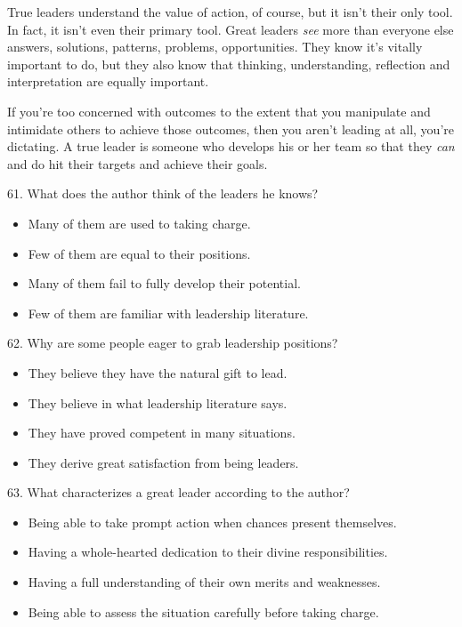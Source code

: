\documentclass[UTF8,11pt]{ctexart}
\begin{document}
True leaders understand the value of action, of course, but it isn’t their only tool. In fact, it isn’t even their primary tool. Great leaders\textit{ see} more than everyone else answers, solutions, patterns, problems, opportunities. They know it’s vitally important to do, but they also know that thinking, understanding, reflection and interpretation are equally important.


If you’re too concerned with outcomes to the extent that you manipulate and intimidate others to achieve those outcomes, then you aren’t leading at all, you’re dictating. A true leader is someone who develops his or her team so that they\textit{ can} and do hit their targets and achieve their goals.


61. What does the author think of the leaders he knows?


\begin{itemize}[leftmargin=2em,itemsep=.2em,topsep=.4em]\item[A.] Many of them are used to taking charge.
\item[B.] Few of them are equal to their positions.
\item[C.] Many of them fail to fully develop their potential.
\item[D.] Few of them are familiar with leadership literature.
\end{itemize}

62. Why are some people eager to grab leadership positions?


\begin{itemize}[leftmargin=2em,itemsep=.2em,topsep=.4em]\item[A.] They believe they have the natural gift to lead.
\item[B.] They believe in what leadership literature says.
\item[C.] They have proved competent in many situations.
\item[D.] They derive great satisfaction from being leaders.
\end{itemize}

63. What characterizes a great leader according to the author?


\begin{itemize}[leftmargin=2em,itemsep=.2em,topsep=.4em]\item[A.] Being able to take prompt action when chances present themselves.
\item[B.] Having a whole-hearted dedication to their divine responsibilities.
\item[C.] Having a full understanding of their own merits and weaknesses.
\item[D.] Being able to assess the situation carefully before taking charge.
\end{itemize}
\end{document}
